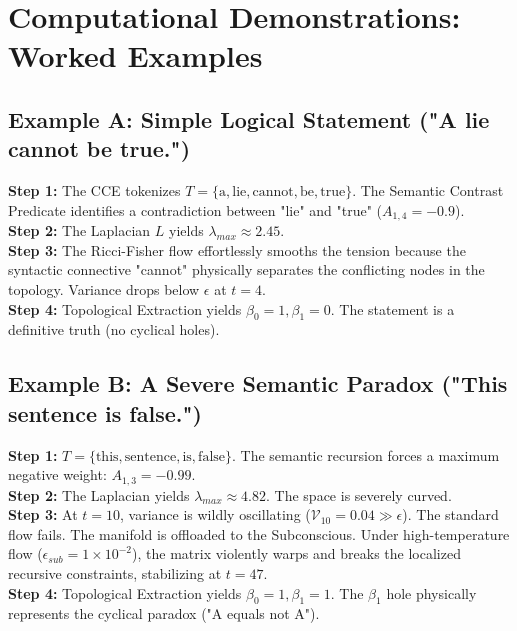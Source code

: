 \documentclass[11pt,a4paper,twocolumn]{article}
\begin{document}
\section{Computational Demonstrations: Worked Examples}

\subsection{Example A: Simple Logical Statement ("A lie cannot be true.")}
\textbf{Step 1:} The CCE tokenizes $T = \{ \text{a}, \text{lie}, \text{cannot}, \text{be}, \text{true} \}$. The Semantic Contrast Predicate identifies a contradiction between "lie" and "true" ($A_{1,4} = -0.9$).\\
\textbf{Step 2:} The Laplacian $L$ yields $\lambda_{max} \approx 2.45$.\\
\textbf{Step 3:} The Ricci-Fisher flow effortlessly smooths the tension because the syntactic connective "cannot" physically separates the conflicting nodes in the topology. Variance drops below $\epsilon$ at $t=4$.\\
\textbf{Step 4:} Topological Extraction yields $\beta_0 = 1, \beta_1 = 0$. The statement is a definitive truth (no cyclical holes).

\subsection{Example B: A Severe Semantic Paradox ("This sentence is false.")}
\textbf{Step 1:} $T = \{ \text{this}, \text{sentence}, \text{is}, \text{false} \}$. The semantic recursion forces a maximum negative weight: $A_{1,3} = -0.99$.\\
\textbf{Step 2:} The Laplacian yields $\lambda_{max} \approx 4.82$. The space is severely curved.\\
\textbf{Step 3:} At $t=10$, variance is wildly oscillating ($\mathcal{V}_{10} = 0.04 \gg \epsilon$). The standard flow fails. The manifold is offloaded to the Subconscious. Under high-temperature flow ($\epsilon_{sub} = 1 \times 10^{-2}$), the matrix violently warps and breaks the localized recursive constraints, stabilizing at $t=47$.\\
\textbf{Step 4:} Topological Extraction yields $\beta_0 = 1, \beta_1 = 1$. The $\beta_1$ hole physically represents the cyclical paradox ("A equals not A").
\end{document}
